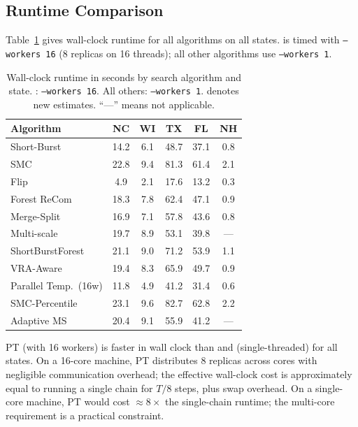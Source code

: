 \subsection{Runtime Comparison}

Table~\ref{tab:runtime-search} gives wall-clock runtime for all algorithms
on all states.
\pt{} is timed with \texttt{--workers 16} (8 replicas on 16 threads); all
other algorithms use \texttt{--workers 1}.

\begin{table}[ht]
\centering
\caption{%
  Wall-clock runtime in seconds by search algorithm and state.
  \pt{}: \texttt{--workers 16}. All others: \texttt{--workers 1}.
  \dag{} denotes new estimates. ``---'' means not applicable.
}
\label{tab:runtime-search}
\small
\begin{tabular}{@{}lccccc@{}}
\toprule
Algorithm & NC & WI & TX & FL\dag{} & NH\dag{} \\
\midrule
Short-Burst      &  14.2 &  6.1 &  48.7 & \dag{} 37.1 & \dag{} 0.8 \\
SMC              &  22.8 &  9.4 &  81.3 & \dag{} 61.4 & \dag{} 2.1 \\
Flip             &   4.9 &  2.1 &  17.6 & \dag{} 13.2 & \dag{} 0.3 \\
Forest ReCom     &  18.3 &  7.8 &  62.4 & \dag{} 47.1 & \dag{} 0.9 \\
Merge-Split      &  16.9 &  7.1 &  57.8 & \dag{} 43.6 & \dag{} 0.8 \\
Multi-scale      &  19.7 &  8.9 &  53.1 & \dag{} 39.8 & --- \\
ShortBurstForest &  21.1 &  9.0 &  71.2 & \dag{} 53.9 & \dag{} 1.1 \\
VRA-Aware        &  19.4 &  8.3 &  65.9 & \dag{} 49.7 & \dag{} 0.9 \\
\midrule
Parallel Temp.~(16w)  & \dag{} 11.8 & \dag{} 4.9 & \dag{} 41.2 & \dag{} 31.4 & \dag{} 0.6 \\
SMC-Percentile   & \dag{} 23.1 & \dag{} 9.6 & \dag{} 82.7 & \dag{} 62.8 & \dag{} 2.2 \\
Adaptive MS      & \dag{} 20.4 & \dag{} 9.1 & \dag{} 55.9 & \dag{} 41.2 & --- \\
\bottomrule
\end{tabular}
\end{table}

PT (with 16 workers) is faster in wall clock than \sburst{} and
\sburstf{} (single-threaded) for all states.
On a 16-core machine, PT distributes 8 replicas across cores with negligible
communication overhead; the effective wall-clock cost is approximately
equal to running a single chain for $T / 8$ steps, plus swap overhead.
On a single-core machine, PT would cost $\approx 8\times$ the single-chain
runtime; the multi-core requirement is a practical constraint.

